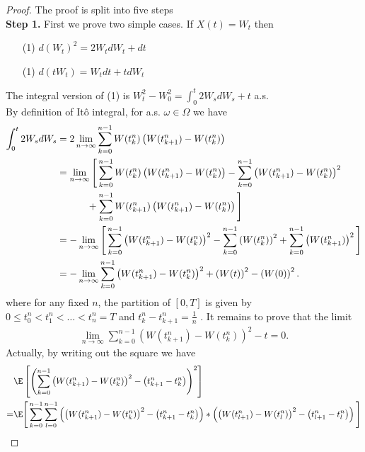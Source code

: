 \begin{proof}
  The proof is split into five steps \\[1ex]
  \textbf{Step 1.} First we prove two simple cases. If $X(t)=W_t$ then 
  \begin{enumerate}
    \item[(1)] $d(W_t)^2 = 2W_t dW_t + dt $
    \item[(1)] $d(tW_t) = W_t dt + t dW_t$
  \end{enumerate}
 The integral version of (1) is $W_t^2 - W_0^2 = \int_0^{t} 2W_s dW_s + t$ a.s.\\
  By definition of It\^o integral, for a.s. $\omega  \in \Omega $ we have 
  \begin{align*}
    \int_0^{t}2W_sdW_s &= 2 \lim_{n\to \infty} \sum_{k=0}^{n-1} W(t_k^{n} )\left(W(t_{k+1}^{n})-W(t_k^{n} )\right)\\
                       &= \lim_{n\to \infty} \Bigg[\sum_{k=0}^{n-1} W(t_k^{n})\left(W(t_{k+1}^{n}) - W(t_k^{n} )\right) - \sum_{k=0}^{n-1}\left(W(t_{k+1}^{n})-W(t_k^{n}) \right)^2  \\
                       & \hspace{1.1cm}+ \sum_{k=0}^{n-1}W(t_{k+1}^{n} )  \left(W(t_{k+1}^{n})-W(t_k^{n} ) \right) \Bigg]\\
                       &= - \lim_{n\to \infty} \Bigg[\sum_{k=0}^{n-1}\left( W(t_{k+1}^{n}) - W(t_k^{n} ) \right)^2 -  \sum_{k=0}^{n-1}\left(W(t_k^{n} )\right)^2 + \sum_{k=0}^{n-1}\left( W(t_{k+1}^n) \right)^2      \Bigg]\\
                       &= - \lim_{n\to \infty} \sum_{k=0}^{n-1}\left( W(t_{k+1}^{n}) - W(t_k^{n} ) \right)^2 +  \left(W(t)\right)^2 - \left( W(0) \right)^2 
  .\end{align*}
  where for any fixed $n$, the partition of $[0,T]$ is given by $0\le t_{0}^{n} < t_{1}^{n} < \ldots <t_n^{n} = T   $ and 
  $t_{k}^{n} - t_{k+1}^{n}   = \frac{1}{n}$ . It remains to prove that the limit 
  \begin{align*}
    \lim_{n\to \infty}\sum_{k=0}^{n-1} \left( W(t_{k+1}^{n} ) - W(t_k^{n} ) \right)^2 - t = 0 
  .\end{align*}
 Actually, by writing out the square we have 
  \begin{align*}
  &  \E \left[ \left( \sum_{k=0}^{n-1}\left( W(t_{k+1}^{n} ) - W(t_k^{n})\right)^2 - \left( t_{k+1}^{n} - t_k^{n}   \right)   \right)^2   \right] \\
  =&\E\Bigg[\sum_{k=0}^{n-1}\sum_{l=0}^{n-1}
    \left( \left( W(t_{k+1}^{n} ) - W(t_k^{n})\right)^2 - \left( t_{k+1}^{n} - t_k^{n}   \right)   \right)                                                                                                                                                                                                                                                                                         *\left( \left( W(t_{l+1}^{n} ) - W(t_l^{n})\right)^2 - \left( t_{l+1}^{n} - t_l^{n}   \right)   \right) \Bigg]

\end{align*}
\end{proof}
